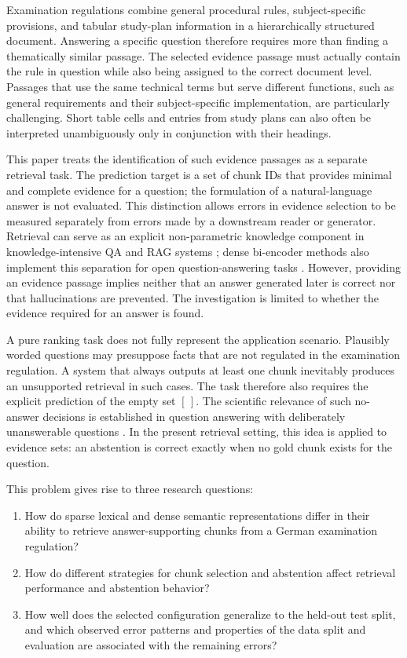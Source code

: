 \documentclass[11pt]{article}
\begin{document}
Examination regulations combine general procedural rules, subject-specific provisions, and tabular study-plan information in a hierarchically structured document. Answering a specific question therefore requires more than finding a thematically similar passage. The selected evidence passage must actually contain the rule in question while also being assigned to the correct document level. Passages that use the same technical terms but serve different functions, such as general requirements and their subject-specific implementation, are particularly challenging. Short table cells and entries from study plans can also often be interpreted unambiguously only in conjunction with their headings.

This paper treats the identification of such evidence passages as a separate retrieval task. The prediction target is a set of chunk IDs that provides minimal and complete evidence for a question; the formulation of a natural-language answer is not evaluated. This distinction allows errors in evidence selection to be measured separately from errors made by a downstream reader or generator. Retrieval can serve as an explicit non-parametric knowledge component in knowledge-intensive QA and RAG systems \citep{lewis2020rag}; dense bi-encoder methods also implement this separation for open question-answering tasks \citep{karpukhin-etal-2020-dense}. However, providing an evidence passage implies neither that an answer generated later is correct nor that hallucinations are prevented. The investigation is limited to whether the evidence required for an answer is found.

A pure ranking task does not fully represent the application scenario. Plausibly worded questions may presuppose facts that are not regulated in the examination regulation. A system that always outputs at least one chunk inevitably produces an unsupported retrieval in such cases. The task therefore also requires the explicit prediction of the empty set $[\,]$. The scientific relevance of such no-answer decisions is established in question answering with deliberately unanswerable questions \citep{rajpurkar-etal-2018-know}. In the present retrieval setting, this idea is applied to evidence sets: an abstention is correct exactly when no gold chunk exists for the question.

This problem gives rise to three research questions:

\begin{enumerate}
    \item[\textbf{RQ1}] How do sparse lexical and dense semantic representations differ in their ability to retrieve answer-supporting chunks from a German examination regulation?
    \item[\textbf{RQ2}] How do different strategies for chunk selection and abstention affect retrieval performance and abstention behavior?
    \item[\textbf{RQ3}] How well does the selected configuration generalize to the held-out test split, and which observed error patterns and properties of the data split and evaluation are associated with the remaining errors?
\end{enumerate}
\end{document}
